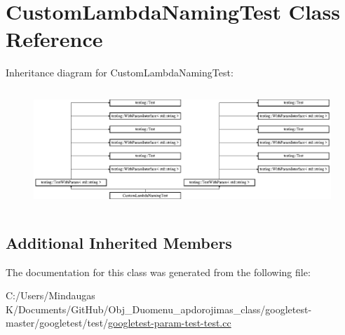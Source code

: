 \hypertarget{class_custom_lambda_naming_test}{}\section{Custom\+Lambda\+Naming\+Test Class Reference}
\label{class_custom_lambda_naming_test}
Inheritance diagram for Custom\+Lambda\+Naming\+Test\+:\begin{figure}[H]
\begin{center}
\leavevmode
\includegraphics[height=4.497992cm]{d1/d59/class_custom_lambda_naming_test}
\end{center}
\end{figure}
\subsection*{Additional Inherited Members}


The documentation for this class was generated from the following file\+:\begin{DoxyCompactItemize}
\item 
C\+:/\+Users/\+Mindaugas K/\+Documents/\+Git\+Hub/\+Obj\+\_\+\+Duomenu\+\_\+apdorojimas\+\_\+class/googletest-\/master/googletest/test/\mbox{\hyperlink{googletest-master_2googletest_2test_2googletest-param-test-test_8cc}{googletest-\/param-\/test-\/test.\+cc}}\end{DoxyCompactItemize}
